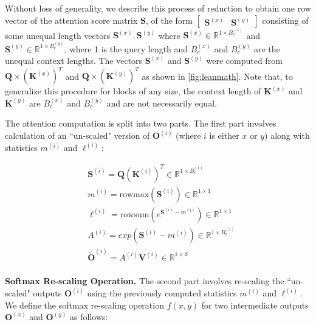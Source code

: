 Without loss of generality, we describe this process of reduction to obtain one row vector of the attention score matrix $\mathbf{S}$, of the form $

\begin{bmatrix} \mathbf{S}^{(x)} & \mathbf{S}^{(y)} \end{bmatrix}

$ consisting of some unequal length vectors
$\mathbf{S}^{(x)}, \mathbf{S}^{(y)}$ where $\mathbf{S}^{(x)} \in \mathbb{R}^{1 \times B_c^{(x)}}$ and $\mathbf{S}^{(y)} \in \mathbb{R}^{1 \times B_c^{(y)}}$, where 1 is the query length and $B_c^{(x)}$ and $B_c^{(y)}$ are the unequal context lengths. The vectors $\mathbf{S}^{(x)}$ and $\mathbf{S}^{(y)}$ were computed from $\mathbf{Q} \times (\mathbf{K}^{(x)})^{T}$ and $\mathbf{Q} \times (\mathbf{K}^{(y)})^{T}$ as shown in \autoref{fig:leanmath}. Note that, to generalize this procedure for blocks of any size, the context length of $ \mathbf{K}^{(x)}$ and $\mathbf{K}^{(y)}$ are $B_c^{(x)}$ and $B_c^{(y)}$ and are not necessarily equal.

The attention computation is split into two parts. The first part involves calculation of an ``un-scaled" version of $\mathbf{O}^{(i)}$ (where $i$ is either $x$ or $y$) along with statistics $m^{(i)}$ and $\ell^{(i)}$:

\begin{align*}
 & \mathbf{S}^{(i)} = \mathbf{Q} (\mathbf{K}^{(i)})^{T} \in \mathbb{R}^{1 \times B_c^{(i)}}\\
& m^{(i)} = \mathrm{rowmax}(\mathbf{S}^{(i)})  \in \mathbb{R}^{1 \times 1}\\
 & \ell^{(i)} = \mathrm{rowsum}(e^{\mathbf{S}^{(i)} - m^{(i)}}) \in \mathbb{R}^{1 \times 1} \\
 & A^{(i)} = exp(\mathbf{S}^{(i)} - m^{(i)}) \in \mathbb{R}^{1 \times B_c^{(i)}}\\
 & {\tilde{\mathbf{O}}}^{(i)} = A^{(i)} \mathbf{V}^{(i)} \in \mathbb{R}^{1 \times d}\\
\end{align*}

{\textbf{Softmax Re-scaling Operation.}} The second part involves re-scaling the ``un-scaled" outputs ${\mathbf{O}}^{(\mathrm{i})}$ using the previously computed statistics $m^{(i)}$ and $\ell^{(i)}$. \\
We define the softmax re-scaling operation $f(x,y)$ for two intermediate outputs $\mathbf{O}^{(x)}$ and $\mathbf{O}^{(y)}$ as follows: \\

